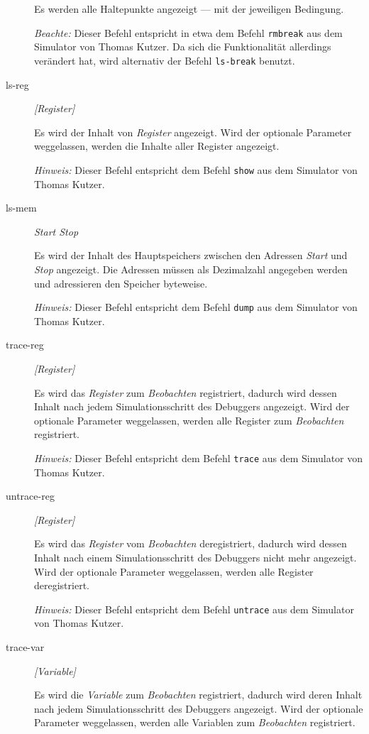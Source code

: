 \begin{description}
Es werden alle Haltepunkte angezeigt --- mit der jeweiligen Bedingung.

\emph{Beachte:} Dieser Befehl entspricht in etwa dem Befehl \texttt{rmbreak} aus dem Simulator von Thomas Kutzer. Da sich die Funktionalität allerdings verändert hat, wird alternativ der Befehl \texttt{ls-break} benutzt.

\item[ls-reg] \emph{[Register]}

Es wird der Inhalt von \emph{Register} angezeigt. Wird der optionale Parameter weggelassen, werden die Inhalte aller Register angezeigt.

\emph{Hinweis:} Dieser Befehl entspricht dem Befehl \texttt{show} aus dem Simulator von Thomas Kutzer.

\item[ls-mem] \emph{Start Stop}

Es wird der Inhalt des Hauptspeichers zwischen den Adressen \emph{Start} und \emph{Stop} angezeigt. Die Adressen müssen als Dezimalzahl angegeben werden und adressieren den Speicher byteweise.

\emph{Hinweis:} Dieser Befehl entspricht dem Befehl \texttt{dump} aus dem Simulator von Thomas Kutzer.

\item[trace-reg] \emph{[Register]}

Es wird das \emph{Register} zum \emph{Beobachten} registriert, dadurch wird dessen Inhalt nach jedem Simulationsschritt des Debuggers angezeigt. Wird der optionale Parameter weggelassen, werden alle Register zum \emph{Beobachten} registriert.

\emph{Hinweis:} Dieser Befehl entspricht dem Befehl \texttt{trace} aus dem Simulator von Thomas Kutzer.

\item[untrace-reg] \emph{[Register]}

Es wird das \emph{Register} vom \emph{Beobachten} deregistriert, dadurch wird dessen Inhalt nach einem Simulationsschritt des Debuggers nicht mehr angezeigt. Wird der optionale Parameter weggelassen, werden alle Register deregistriert.

\emph{Hinweis:} Dieser Befehl entspricht dem Befehl \texttt{untrace} aus dem Simulator von Thomas Kutzer.

\item[trace-var] \emph{[Variable]}

Es wird die \emph{Variable} zum \emph{Beobachten} registriert, dadurch wird deren Inhalt nach jedem Simulationsschritt des Debuggers angezeigt. Wird der optionale Parameter weggelassen, werden alle Variablen zum \emph{Beobachten} registriert.


\end{description}
